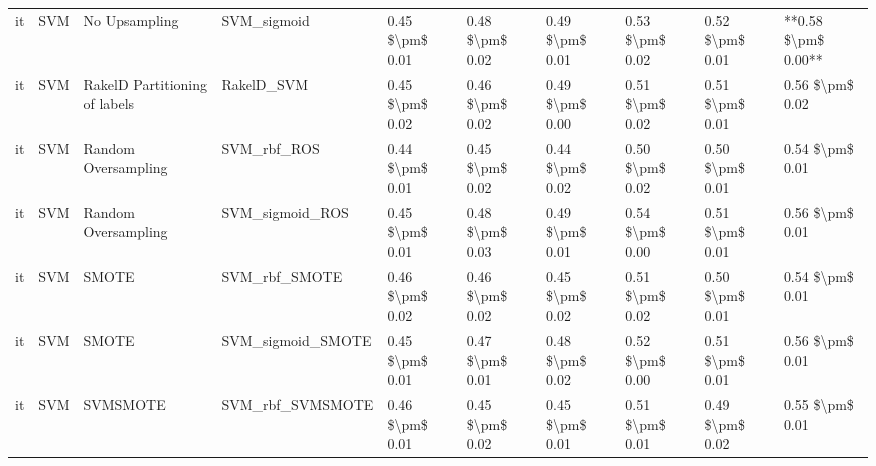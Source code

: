 \begin{tabular}{llllllllll}
      it &                             SVM &                 No Upsampling &                                  SVM\_sigmoid & 0.45 \$\textbackslash pm\$ 0.01 &           0.48 \$\textbackslash pm\$ 0.02 &       0.49 \$\textbackslash pm\$ 0.01 &        0.53 \$\textbackslash pm\$ 0.02 &                         0.52 \$\textbackslash pm\$ 0.01 & **0.58 \$\textbackslash pm\$ 0.00** \\
      it &                             SVM & RakelD Partitioning of labels &                                   RakelD\_SVM & 0.45 \$\textbackslash pm\$ 0.02 &           0.46 \$\textbackslash pm\$ 0.02 &       0.49 \$\textbackslash pm\$ 0.00 &        0.51 \$\textbackslash pm\$ 0.02 &                         0.51 \$\textbackslash pm\$ 0.01 &     0.56 \$\textbackslash pm\$ 0.02 \\
      it &                             SVM &           Random Oversampling &                                  SVM\_rbf\_ROS & 0.44 \$\textbackslash pm\$ 0.01 &           0.45 \$\textbackslash pm\$ 0.02 &       0.44 \$\textbackslash pm\$ 0.02 &        0.50 \$\textbackslash pm\$ 0.02 &                         0.50 \$\textbackslash pm\$ 0.01 &     0.54 \$\textbackslash pm\$ 0.01 \\
      it &                             SVM &           Random Oversampling &                              SVM\_sigmoid\_ROS & 0.45 \$\textbackslash pm\$ 0.01 &           0.48 \$\textbackslash pm\$ 0.03 &       0.49 \$\textbackslash pm\$ 0.01 &        0.54 \$\textbackslash pm\$ 0.00 &                         0.51 \$\textbackslash pm\$ 0.01 &     0.56 \$\textbackslash pm\$ 0.01 \\
      it &                             SVM &                         SMOTE &                                SVM\_rbf\_SMOTE & 0.46 \$\textbackslash pm\$ 0.02 &           0.46 \$\textbackslash pm\$ 0.02 &       0.45 \$\textbackslash pm\$ 0.02 &        0.51 \$\textbackslash pm\$ 0.02 &                         0.50 \$\textbackslash pm\$ 0.01 &     0.54 \$\textbackslash pm\$ 0.01 \\
      it &                             SVM &                         SMOTE &                            SVM\_sigmoid\_SMOTE & 0.45 \$\textbackslash pm\$ 0.01 &           0.47 \$\textbackslash pm\$ 0.01 &       0.48 \$\textbackslash pm\$ 0.02 &        0.52 \$\textbackslash pm\$ 0.00 &                         0.51 \$\textbackslash pm\$ 0.01 &     0.56 \$\textbackslash pm\$ 0.01 \\
      it &                             SVM &                      SVMSMOTE &                             SVM\_rbf\_SVMSMOTE & 0.46 \$\textbackslash pm\$ 0.01 &           0.45 \$\textbackslash pm\$ 0.02 &       0.45 \$\textbackslash pm\$ 0.01 &        0.51 \$\textbackslash pm\$ 0.01 &                         0.49 \$\textbackslash pm\$ 0.02 &     0.55 \$\textbackslash pm\$ 0.01 \\

\end{tabular}
